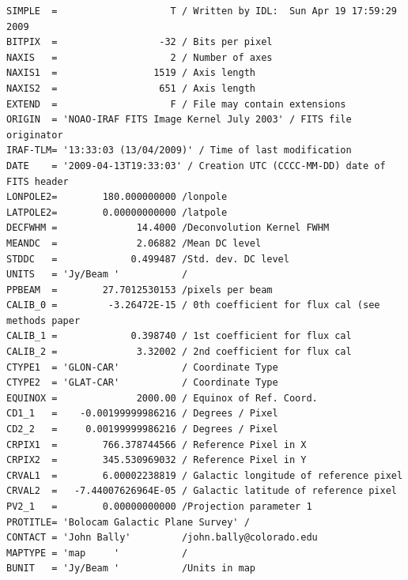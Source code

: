 \documentclass[12pt,preprint]{aastex}
\begin{document}
\begin{appendix}
\begin{verbatim}
SIMPLE  =                    T / Written by IDL:  Sun Apr 19 17:59:29 2009      
BITPIX  =                  -32 / Bits per pixel                                 
NAXIS   =                    2 / Number of axes                                 
NAXIS1  =                 1519 / Axis length                                    
NAXIS2  =                  651 / Axis length                                    
EXTEND  =                    F / File may contain extensions                    
ORIGIN  = 'NOAO-IRAF FITS Image Kernel July 2003' / FITS file originator        
IRAF-TLM= '13:33:03 (13/04/2009)' / Time of last modification                   
DATE    = '2009-04-13T19:33:03' / Creation UTC (CCCC-MM-DD) date of FITS header 
LONPOLE2=        180.000000000 /lonpole                                         
LATPOLE2=        0.00000000000 /latpole                                         
DECFWHM =              14.4000 /Deconvolution Kernel FWHM                       
MEANDC  =              2.06882 /Mean DC level                                   
STDDC   =             0.499487 /Std. dev. DC level                              
UNITS   = 'Jy/Beam '           /                                                
PPBEAM  =        27.7012530153 /pixels per beam                                 
CALIB_0 =         -3.26472E-15 / 0th coefficient for flux cal (see methods paper
CALIB_1 =             0.398740 / 1st coefficient for flux cal                   
CALIB_2 =              3.32002 / 2nd coefficient for flux cal                   
CTYPE1  = 'GLON-CAR'           / Coordinate Type                                
CTYPE2  = 'GLAT-CAR'           / Coordinate Type                                
EQUINOX =              2000.00 / Equinox of Ref. Coord.                         
CD1_1   =    -0.00199999986216 / Degrees / Pixel                                
CD2_2   =     0.00199999986216 / Degrees / Pixel                                
CRPIX1  =        766.378744566 / Reference Pixel in X                           
CRPIX2  =        345.530969032 / Reference Pixel in Y                           
CRVAL1  =        6.00002238819 / Galactic longitude of reference pixel          
CRVAL2  =   -7.44007626964E-05 / Galactic latitude of reference pixel           
PV2_1   =        0.00000000000 /Projection parameter 1                          
PROTITLE= 'Bolocam Galactic Plane Survey' /                                     
CONTACT = 'John Bally'         /john.bally@colorado.edu                         
MAPTYPE = 'map     '           /                                                
BUNIT   = 'Jy/Beam '           /Units in map                                    

\end{verbatim}
\end{appendix}
\end{document}
